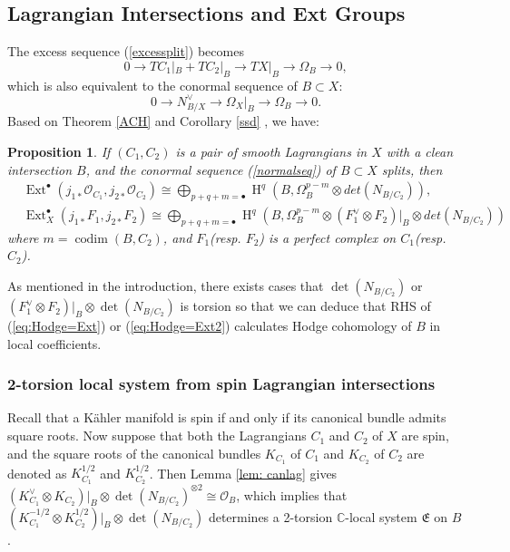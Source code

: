 \documentclass[12pt]{amsart}
\newtheorem{proposition}[theorem]{Proposition}
\theoremstyle{definition}
\theoremstyle{remark}
\numberwithin{equation}{section}
\newcommand{\CC}{\mathbb{C}}
\newcommand{\shO}{\mathcal{O}}
\newcommand{\codim}{\operatorname{codim}}
\newcommand{\Ext}{\operatorname{Ext}}
\newcommand{\arw}{\longrightarrow}
\newcommand{\Hdot}{\operatorname{H}}
\begin{document}
\subsection{Lagrangian Intersections and Ext Groups}
The excess sequence (\ref{excessplit}) becomes 
$$0\arw TC_1|_B+TC_2|_B\arw TX|_B\arw \Omega_B\arw 0,$$
which is also equivalent to the conormal sequence of $B\subset X$:
\begin{equation}\label{normalseq}
    0\arw N_{B/X}^{\vee}\arw \Omega_X|_B\arw \Omega_B\arw0.
\end{equation}
Based on Theorem \ref{ACH} and Corollary \ref{ssd} , we have:
\begin{proposition}\label{prop: ssd}
If $(C_1, C_2)$ is a pair of smooth Lagrangians in $X$ with a clean intersection $B$, and the conormal sequence (\ref{normalseq}) of $B\subset X$ splits, then 
\begin{align}\label{eq:Hodge=Ext}
    & \Ext^{\bullet}(j_{1*}\shO_{C_1},j_{2*}\shO_{C_2})\cong\bigoplus_{p+q+m=\bullet}
\Hdot^q(B, \Omega_{B}^{p-m}\otimes det(N_{B/C_2})),\\
    & \Ext_X^{\bullet}(j_{1*}F_1,j_{2*}F_2)\cong\bigoplus_{p+q+m=\bullet}
\Hdot^q(B,  \Omega_{B}^{p-m}\otimes (F_1^{\vee}\otimes F_2)|_B\otimes det(N_{B/C_2}))\label{eq:Hodge=Ext2}
\end{align}
where $m=\codim(B, C_2)$, and $F_1$(resp. $F_2$) is a perfect complex on $C_1$(resp. $C_2$).
\end{proposition}
As mentioned in the introduction, there exists cases that $\det(N_{B/C_2})$ or $(F_1^{\vee}\otimes F_2)|_B\otimes \det(N_{B/C_2})$ is torsion so that we can deduce that RHS of (\ref{eq:Hodge=Ext}) or (\ref{eq:Hodge=Ext2}) calculates Hodge cohomology of $B$ in local coefficients. 
\subsubsection{2-torsion local system from spin Lagrangian intersections} Recall that a K\"ahler manifold is spin if and only if its canonical bundle admits square roots. Now suppose that both the Lagrangians $C_1$ and $C_2$ of $X$ are spin, and the square roots of the canonical bundles $K_{C_1}$ of $C_1$ and $K_{C_2}$ of $C_2$ are denoted as $K_{C_1}^{1/2}$ and $K_{C_2}^{1/2}$.
Then Lemma \ref{lem: canlag} gives $(K_{C_1}^{\vee}\otimes K_{C_2})|_B\otimes \det(N_{B/C_2})^{\otimes2}\cong \shO_B$, which implies that $(K_{C_1}^{-1/2}\otimes K_{C_2}^{1/2})|_B\otimes \det(N_{B/C_2})$ determines a 2-torsion $\CC$-local system $\mathfrak{E}$ on $B$. 
\end{document}
